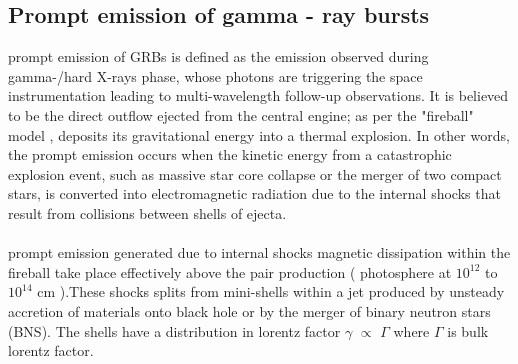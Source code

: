 \subsection{ Prompt emission of  gamma - ray  bursts}
 prompt emission of GRBs is defined as the emission observed during  gamma-/hard X-rays phase, whose photons are triggering the space instrumentation leading to multi-wavelength follow-up observations.	It is believed to be the direct outflow ejected from the central engine; as per the "fireball" model , deposits its gravitational energy into a thermal explosion. In other words, the prompt emission occurs when the kinetic energy from a catastrophic explosion event, such as massive star core collapse or the merger of two compact stars, is converted into electromagnetic radiation due to the internal shocks that result from collisions between shells of ejecta.\citep{23}\\\\
prompt emission generated due to internal shocks magnetic dissipation within the  fireball take place effectively above the pair production (  photosphere at $ 10^{12} $ to  $ 10^{14} $ cm ).These  shocks splits from mini-shells within a jet produced by unsteady accretion of  materials  onto black hole or by the merger of binary neutron stars (BNS). The shells have a distribution in lorentz factor $ \gamma $ $ \propto $ $ \Gamma $ where $ \Gamma $ is bulk lorentz factor.\citep {22}\citep{23}\\\\

